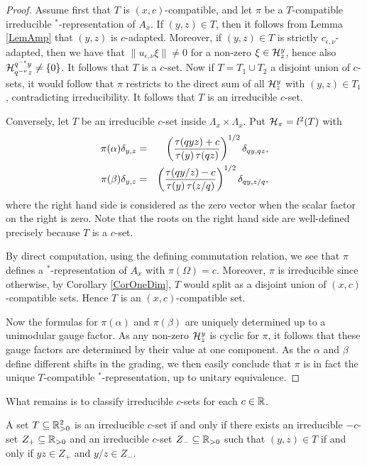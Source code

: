 \begin{proof} Assume first that $T$ is $(x,c)$-compatible, and let $\pi$ be a $T$-compatible irreducible $^*$-representation of $A_x$. If $(y,z)\in T$, then it follows from Lemma \ref{LemAmp} that $(y,z)$ is $c$-adapted. Moreover, if $(y,z)\in T$ is strictly $c_{\epsilon,\nu}$-adapted, then we have that $\|u_{\epsilon,\nu}\xi\|\neq 0$ for a non-zero $\xi\in \mathcal{H}^y_z$, hence also $\mathcal{H}^{q^{-\epsilon}y}_{q^{-\nu}z}\neq \{0\}$. It follows that $T$ is a $c$-set. Now if $T=T_1\cup T_2$ a disjoint union of $c$-sets, it would follow that $\pi$ restricts to the direct sum of all $\mathcal{H}^y_z$ with $(y,z)\in T_1$, contradicting irreducibility. It follows that $T$ is an irreducible $c$-set.

Conversely, let $T$ be an irreducible $c$-set inside $\Lambda_x\times \Lambda_x$. Put $\mathcal{H}_{\pi} = l^2(T)$ with \begin{eqnarray*} \pi(\alpha)  \delta_{y,z} &=&  \left(\frac{\operatorname{\tau}(qyz)+c}{\operatorname{\tau}(y)\operatorname{\tau}(qz)}\right)^{1/2}\delta_{qy,qz},\\ \pi(\beta) \delta_{y,z} &=& \left(\frac{\operatorname{\tau}(qy/z)-c}{\operatorname{\tau}(y)\operatorname{\tau}(z/q)}\right)^{1/2} \delta_{qy,z/q},\end{eqnarray*} where the right hand side is considered as the zero vector when the scalar factor on the right is zero. Note that the roots on the right hand side are well-defined precisely because $T$ is a $c$-set. 

By direct computation, using the defining commutation relation, we see that $\pi$ defines a $^*$-representation of $A_x$ with $\pi(\Omega) =c$. Moreover, $\pi$ is irreducible since otherwise, by Corollary \ref{CorOneDim}, $T$ would split as a disjoint union of $(x,c)$-compatible sets. Hence $T$ is an $(x,c)$-compatible set.

Now the formulas for $\pi(\alpha)$ and $\pi(\beta)$ are uniquely determined up to a unimodular gauge factor. As any non-zero $\mathcal{H}^{y}_z$ is cyclic for $\pi$, it follows that these gauge factors are determined by their value at one component. As the $\alpha$ and $\beta$ define different shifts in the grading, we then easily conclude that $\pi$ is in fact the unique $T$-compatible $^*$-representation, up to unitary equivalence.
\end{proof}

What remains is to classify irreducible $c$-sets for each $c\in \mathbb{R}$. 

\begin{Lem}\label{LemClass2D} A set $T\subseteq \mathbb{R}_{>0}^2$ is an irreducible $c$-set if and only if there exists an irreducible $-c$-set $Z_+\subseteq \mathbb{R}_{>0}$ and an irreducible $c$-set $Z_-\subseteq \mathbb{R}_{>0}$ such that $(y,z)\in T$ if and only if $yz\in Z_+$ and $y/z\in Z_-$.
\end{Lem} 

